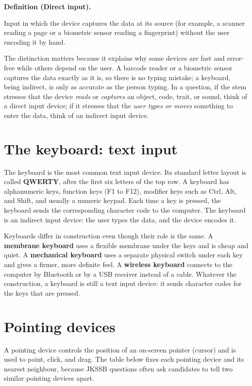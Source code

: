 \documentclass[11pt]{article}
\newenvironment{definitionbox}[1]{%
  \par\noindent\textbf{Definition (#1).}\ \itshape
}{\par\vspace{0.3em}}
\begin{document}
\begin{definitionbox}{Direct input}
Input in which the device captures the data at its source (for example, a
scanner reading a page or a biometric sensor reading a fingerprint) without
the user encoding it by hand.
\end{definitionbox}

The distinction matters because it explains why some devices are fast and
error-free while others depend on the user. A barcode reader or a biometric
sensor captures the data exactly as it is, so there is no typing mistake; a
keyboard, being indirect, is only as accurate as the person typing. In a
question, if the stem stresses that the device \emph{reads} or \emph{captures}
an object, code, trait, or sound, think of a direct input device; if it
stresses that the \emph{user types or moves} something to enter the data,
think of an indirect input device.

\section{The keyboard: text input}
The keyboard is the most common text input device. Its standard letter
layout is called \textbf{QWERTY}, after the first six letters of the top row.
A keyboard has alphanumeric keys, function keys (F1 to F12), modifier keys
such as Ctrl, Alt, and Shift, and usually a numeric keypad. Each time a key
is pressed, the keyboard sends the corresponding character code to the
computer. The keyboard is an indirect input device: the user types the data,
and the device encodes it.

Keyboards differ in construction even though their role is the same. A
\textbf{membrane keyboard} uses a flexible membrane under the keys and is
cheap and quiet. A \textbf{mechanical keyboard} uses a separate physical
switch under each key and gives a firmer, more definite feel. A
\textbf{wireless keyboard} connects to the computer by Bluetooth or by a USB
receiver instead of a cable. Whatever the construction, a keyboard is still a
text input device: it sends character codes for the keys that are pressed.

\section{Pointing devices}
A pointing device controls the position of an on-screen pointer (cursor) and
is used to point, click, and drag. The table below fixes each pointing device
and its nearest neighbour, because JKSSB questions often ask candidates to
tell two similar pointing devices apart.
\end{document}
